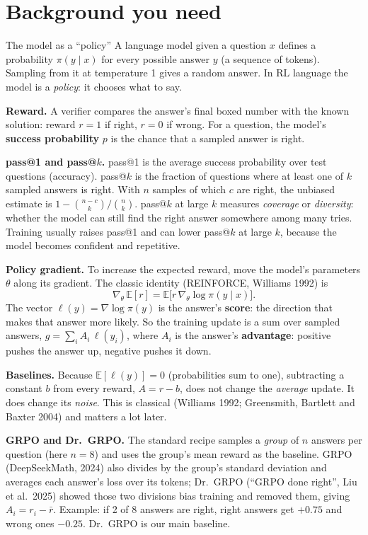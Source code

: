 \documentclass[11pt]{article}
\newcommand{\E}{\mathbb{E}}
\begin{document}
\section{Background you need}

\begin{idea}{The model as a ``policy''}
A language model given a question $x$ defines a probability $\pi(y\mid x)$ for every possible answer $y$ (a sequence of tokens). Sampling from it at temperature 1 gives a random answer. In RL language the model is a \emph{policy}: it chooses what to say.
\end{idea}

\textbf{Reward.} A verifier compares the answer's final boxed number with the known solution: reward $r=1$ if right, $r=0$ if wrong. For a question, the model's \textbf{success probability} $p$ is the chance that a sampled answer is right.

\textbf{pass@1 and pass@$k$.} pass@1 is the average success probability over test questions (accuracy). pass@$k$ is the fraction of questions where at least one of $k$ sampled answers is right. With $n$ samples of which $c$ are right, the unbiased estimate is $1-\binom{n-c}{k}/\binom{n}{k}$. pass@$k$ at large $k$ measures \emph{coverage} or \emph{diversity}: whether the model can still find the right answer somewhere among many tries. Training usually raises pass@1 and can lower pass@$k$ at large $k$, because the model becomes confident and repetitive.

\textbf{Policy gradient.} To increase the expected reward, move the model's parameters $\theta$ along its gradient. The classic identity (REINFORCE, Williams 1992) is
\[
\nabla_\theta\,\E[r] = \E\big[r\,\nabla_\theta\log\pi(y\mid x)\big].
\]
The vector $\ell(y)=\nabla\log\pi(y)$ is the answer's \textbf{score}: the direction that makes that answer more likely. So the training update is a sum over sampled answers, $g=\sum_i A_i\,\ell(y_i)$, where $A_i$ is the answer's \textbf{advantage}: positive pushes the answer up, negative pushes it down.

\textbf{Baselines.} Because $\E[\ell(y)]=0$ (probabilities sum to one), subtracting a constant $b$ from every reward, $A=r-b$, does not change the \emph{average} update. It does change its \emph{noise}. This is classical (Williams 1992; Greensmith, Bartlett and Baxter 2004) and matters a lot later.

\textbf{GRPO and Dr.\ GRPO.} The standard recipe samples a \emph{group} of $n$ answers per question (here $n=8$) and uses the group's mean reward as the baseline. GRPO (DeepSeekMath, 2024) also divides by the group's standard deviation and averages each answer's loss over its tokens; Dr.\ GRPO (``GRPO done right'', Liu et al.\ 2025) showed those two divisions bias training and removed them, giving $A_i=r_i-\bar r$. Example: if 2 of 8 answers are right, right answers get $+0.75$ and wrong ones $-0.25$. Dr.\ GRPO is our main baseline.
\end{document}
